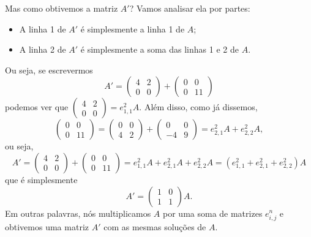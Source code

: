 \begin{ex}
	Mas como obtivemos a matriz $A'$? Vamos analisar ela por partes:
	
	\begin{itemize}
		\item A linha 1 de $A'$ é simplesmente a linha 1 de $A$;
		\item A linha 2 de $A'$ é simplesmente a soma das linhas 1 e 2 de $A$.
	\end{itemize}

Ou seja, se escrevermos
\[A'=\begin{pmatrix}
4 & 2\\0&0
\end{pmatrix}+\begin{pmatrix}
0&0\\0&11
\end{pmatrix}\]podemos ver que $\left(\begin{smallmatrix}
4&2\\0&0
\end{smallmatrix}\right)=e^2_{1,1}A$. Além disso, como já dissemos, 
\[\begin{pmatrix}
0&0\\0&11
\end{pmatrix}=\begin{pmatrix}
0&0\\4&2
\end{pmatrix}+\begin{pmatrix}
0&0\\-4&9
\end{pmatrix}=e^2_{2,1}A+e^2_{2,2}A,\]ou seja,
\[A'=\begin{pmatrix}
4 & 2\\0&0
\end{pmatrix}+\begin{pmatrix}
0&0\\0&11
\end{pmatrix}=e^2_{1,1}A+e^2_{2,1}A+e^2_{2,2}A=(e^2_{1,1}+e^2_{2,1}+e^2_{2,2})A\]que é simplesmente
\[A'=\begin{pmatrix}
1 & 0\\1 & 1
\end{pmatrix}A.\]Em outras palavras, nós multiplicamos $A$ por uma soma de matrizes $e^n_{i,j}$ e obtivemos uma matriz $A'$ com as mesmas soluções de $A$.
\end{ex}
